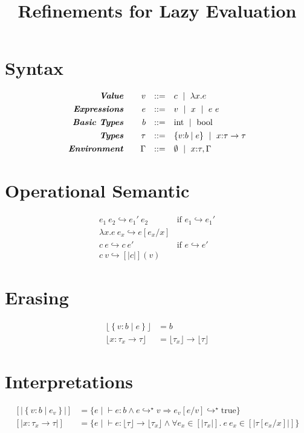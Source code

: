 \documentclass[10pt,a4paper]{article}
\title{Refinements for Lazy Evaluation}
\newcommand\efun[2]{\ensuremath{\lambda #1 . #2}}
\newcommand\eapp[2]{\ensuremath{#1 \ #2}}
\newcommand\etrue{\ensuremath{\text{true}}}
\newcommand\tint{\ensuremath{\text{int}}}
\newcommand\tbool{\ensuremath{\text{bool}}}
\newcommand\tref[3]{\ensuremath{\left\lbrace #1 \colon #2 \mid #3 \right\rbrace}}
\newcommand\tfun[3]{\ensuremath{#1\colon #2 \rightarrow #3}}
\newcommand\sub[2]{\ensuremath{\left[ #2 / #1 \right]}}
\newcommand\erase[1]{\ensuremath{\lfloor #1 \rfloor}}
\newcommand\interp[1]{\ensuremath{[|#1|]}}
\newcommand\eval[2]{\ensuremath{#1 \hookrightarrow #2}}
\newcommand\evals[2]{\ensuremath{#1 \hookrightarrow^\star #2}}
\newcommand\hastype[3]{\ensuremath{#1 \vdash #2 \colon #3}}
\begin{document}
\section*{Syntax}
$$
\begin{array}{rrcl}
\emphbf{Value} \quad 
  & v
  & ::= 
  &   	 c 
  \spmid \efun{x}{e} 
  \\[0.05in] 


\emphbf{Expressions} \quad 
  & e
  & ::= 
  &   	 v 
  \spmid x 
  \spmid \eapp{e}{e}    
  \\[0.05in] 

\emphbf{Basic Types} \quad 
  & b
  & ::=  
  & 	\tint \spmid \tbool
  \\[0.05in] 

\emphbf{Types} \quad 
  & \tau
  & ::=  
  & 	\tref{v}{b}{e}
  \spmid \tfun{x}{\tau}{\tau}    
  \\[0.05in] 

\emphbf{Environment} \quad 
  & \Gamma
  & ::= 
  &     \emptyset \spmid x\colon \tau, \Gamma

\end{array}
$$


\section*{Operational Semantic}

$$
\begin{array}{ll}
\eval{\eapp{e_1}{e_2}}{\eapp{e_1'}{e_2}} & \text{if } \eval{e_1}{e_1'}\\
\eval{\eapp{\efun{x}{e}}{e_x}}{e\sub{x}{e_x}} &\\
\eval{\eapp{c}{e}}{\eapp{c}{e'}} & \text{if } \eval{e}{e'}\\
\eval{\eapp{c}{v}}{[|c|](v)}
\end{array}
$$

\section*{Erasing}
\begin{align*}
\erase{\tref{v}{b}{e}}&=b\\
\erase{\tfun{x}{\tau_x}{\tau}}&= \erase{\tau_x} \rightarrow \erase{\tau}
\end{align*}

\section*{Interpretations}
\begin{align*}
\interp{\tref{v}{b}{e_v}} &= 
	\{e \mid \hastype{}{e}{b} 
	\land 
	\evals{e}{v} \Rightarrow \evals{e_v\sub{v}{e}}{\etrue} \}\\
\interp{\tfun{x}{\tau_x}{\tau}} &= 
	\{e \mid \hastype{}{e}{\erase{\tau} \rightarrow \erase{\tau_x}} 
	\land 
	\forall e_x \in \interp{\tau_x}. \
	 \eapp{e}{e_x} \in \interp{\tau\sub{x}{e_x}} 
	 \}
\end{align*}
\end{document}
